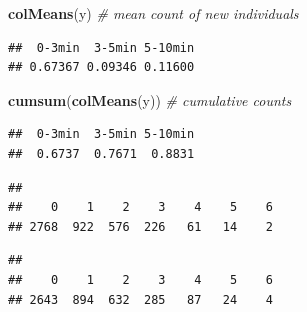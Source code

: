 \documentclass[12pt,]{book}
\newenvironment{Shaded}{\begin{snugshade}}{\end{snugshade}}
\newcommand{\CommentTok}[1]{\textcolor[rgb]{0.56,0.35,0.01}{\textit{#1}}}
\newcommand{\DataTypeTok}[1]{\textcolor[rgb]{0.13,0.29,0.53}{#1}}
\newcommand{\KeywordTok}[1]{\textcolor[rgb]{0.13,0.29,0.53}{\textbf{#1}}}
\newcommand{\NormalTok}[1]{#1}
\newcommand{\OperatorTok}[1]{\textcolor[rgb]{0.81,0.36,0.00}{\textbf{#1}}}
\newcommand{\StringTok}[1]{\textcolor[rgb]{0.31,0.60,0.02}{#1}}
\begin{document}
\begin{Shaded}
\begin{Highlighting}[]
\KeywordTok{colMeans}\NormalTok{(y) }\CommentTok{# mean count of new individuals}
\end{Highlighting}
\end{Shaded}

\begin{verbatim}
##  0-3min  3-5min 5-10min 
## 0.67367 0.09346 0.11600
\end{verbatim}

\begin{Shaded}
\begin{Highlighting}[]
\KeywordTok{cumsum}\NormalTok{(}\KeywordTok{colMeans}\NormalTok{(y)) }\CommentTok{# cumulative counts}
\end{Highlighting}
\end{Shaded}

\begin{verbatim}
##  0-3min  3-5min 5-10min 
##  0.6737  0.7671  0.8831
\end{verbatim}

\begin{Shaded}
\end{Shaded}

\begin{verbatim}
## 
##    0    1    2    3    4    5    6 
## 2768  922  576  226   61   14    2
\end{verbatim}

\begin{Shaded}
\end{Shaded}

\begin{verbatim}
## 
##    0    1    2    3    4    5    6 
## 2643  894  632  285   87   24    4
\end{verbatim}
\end{document}
